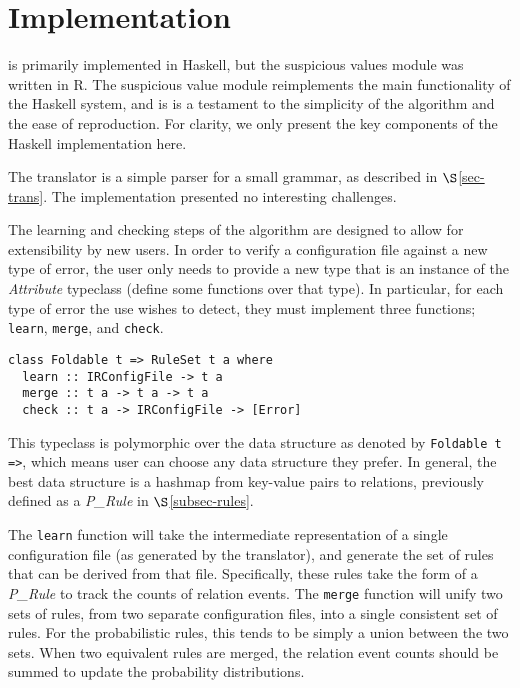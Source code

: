 \section{Implementation}

\app is primarily implemented in Haskell, but the suspicious values module was written in R. The suspicious value module reimplements the main functionality of the Haskell system, and is is a testament to the simplicity of the algorithm and the ease of reproduction. For clarity, we only present the key components of the Haskell implementation here.

The translator is a simple parser for a small grammar, as described in $\S$\ref{sec-trans}. The implementation presented no interesting challenges. 

The learning and checking steps of the algorithm are designed to allow for extensibility by new users. In order to verify a configuration file against a new type of error, the user only needs to provide a new type that is an instance of the \textit{Attribute} typeclass (\ie define some functions over that type). In particular, for each type of error the use wishes to detect, they must implement three functions; \lstinline{learn}, \lstinline{merge}, and \lstinline{check}. 


\begin{lstlisting}
class Foldable t => RuleSet t a where
  learn :: IRConfigFile -> t a
  merge :: t a -> t a -> t a
  check :: t a -> IRConfigFile -> [Error]
\end{lstlisting}

This typeclass is polymorphic over the data structure as denoted by \lstinline{Foldable t =>}, which means user can choose any data structure they prefer.
In general, the best data structure is a hashmap from key-value pairs to relations, previously defined as a \textit{P\_Rule} in $\S$\ref{subsec-rules}.

The \lstinline{learn} function will take the intermediate representation of a single configuration file (as generated by the translator), and generate the set of rules that can be derived from that file.
Specifically, these rules take the form of a \textit{P\_Rule} to track the counts of relation events.
The \lstinline{merge} function will unify two sets of rules, from two separate configuration files, into a single consistent set of rules. 
For the probabilistic rules, this tends to be simply a union between the two sets. 
When two equivalent rules are merged, the relation event counts should be summed to update the probability distributions.

